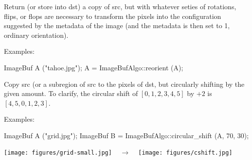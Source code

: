 Return (or store into {\cf dst}) a copy of {\cf src}, but with whatever
seties of rotations, flips, or flops are necessary to transform the pixels
into the configuration suggested by the  metadata of the
image (and the  metadata is then set to 1, ordinary
orientation).

\smallskip
\noindent Examples:
\begin{code}
    ImageBuf A ("tahoe.jpg");
    A = ImageBufAlgo::reorient (A);
\end{code}
\apiend



 

Copy {\cf src} (or a subregion of {\cf src} to the pixels of {\cf dst},
but circularly shifting by the given amount.  To clarify, the circular
shift of $[0,1,2,3,4,5]$ by $+2$ is $[4,5,0,1,2,3]$.

\smallskip
\noindent Examples:
\begin{code}
    ImageBuf A ("grid.jpg");
    ImageBuf B = ImageBufAlgo::circular_shift (A, 70, 30);
\end{code}
\spc \texttt{[image: figures/grid-small.jpg]} 
~ {\Huge $\rightarrow$} ~
\texttt{[image: figures/cshift.jpg]} \\
\apiend


